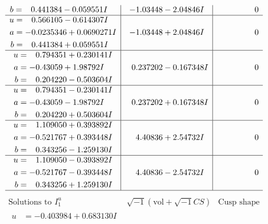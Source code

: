 \documentclass[1p]{elsarticle_modified}
\theoremstyle{definition}
\newcommand{\I}{\sqrt{-1}}
\begin{document}
$$\begin{array}{c|c|c}
\begin{aligned}
b &= \phantom{-}0.441384 - 0.059551 I\end{aligned}
 & -1.03448 - 2.04846 I & \phantom{-0.000000 } 0 \\ \hline\begin{aligned}
u &= \phantom{-}0.566105 - 0.614307 I \\
a &= -0.0235346 + 0.0690271 I \\
b &= \phantom{-}0.441384 + 0.059551 I\end{aligned}
 & -1.03448 + 2.04846 I & \phantom{-0.000000 } 0 \\ \hline\begin{aligned}
u &= \phantom{-}0.794351 + 0.230141 I \\
a &= -0.43059 + 1.98792 I \\
b &= \phantom{-}0.204220 - 0.503604 I\end{aligned}
 & \phantom{-}0.237202 - 0.167348 I & \phantom{-0.000000 } 0 \\ \hline\begin{aligned}
u &= \phantom{-}0.794351 - 0.230141 I \\
a &= -0.43059 - 1.98792 I \\
b &= \phantom{-}0.204220 + 0.503604 I\end{aligned}
 & \phantom{-}0.237202 + 0.167348 I & \phantom{-0.000000 } 0 \\ \hline\begin{aligned}
u &= \phantom{-}1.109050 + 0.393892 I \\
a &= -0.521767 + 0.393448 I \\
b &= \phantom{-}0.343256 - 1.259130 I\end{aligned}
 & \phantom{-}4.40836 + 2.54732 I & \phantom{-0.000000 } 0 \\ \hline\begin{aligned}
u &= \phantom{-}1.109050 - 0.393892 I \\
a &= -0.521767 - 0.393448 I \\
b &= \phantom{-}0.343256 + 1.259130 I\end{aligned}
 & \phantom{-}4.40836 - 2.54732 I & \phantom{-0.000000 } 0\\
 \hline 
 \end{array}$$\newpage$$\begin{array}{c|c|c}  
\text{Solutions to }I^u_{1}& \I (\text{vol} + \sqrt{-1}CS) & \text{Cusp shape}\\
 \hline 
\begin{aligned}
u &= -0.403984 + 0.683130 I \\

\end{aligned}
\end{array}$$
\end{document}
